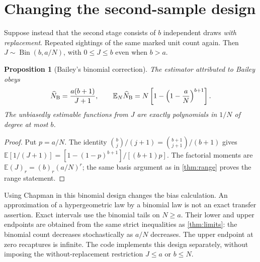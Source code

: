 \documentclass[11pt]{article}
\newtheorem{proposition}[theorem]{Proposition}
\theoremstyle{remark}\newtheorem{remark}[theorem]{Remark}
\newcommand{\E}{\mathbb E}\newcommand{\PP}{\mathbb P}
\newcommand{\fall}[2]{(#1)_{#2}}\newcommand{\rise}[2]{(#1)^{\overline{#2}}}
\begin{document}
\section{Changing the second-sample design}
Suppose instead that the second stage consists of $b$ independent draws
\emph{with replacement}. Repeated sightings of the same marked unit count
again. Then $J\sim\operatorname{Bin}(b,a/N)$, with $0\le J\le b$ even
when $b>a$.
\begin{proposition}[Bailey's binomial correction]\label{prop:bailey}
The estimator attributed to Bailey \cite{Bailey1951,Bailey1952} obeys
\[
 \widehat N_{\rm B}=\frac{a(b+1)}{J+1},\qquad
 \E_N\widehat N_{\rm B}
 =N\left[1-\left(1-\frac aN\right)^{b+1}\right].
\]
The unbiasedly estimable functions from $J$ are exactly polynomials in
$1/N$ of degree at most $b$.
\end{proposition}
\begin{proof}
Put $p=a/N$. The identity
$\binom bj/(j+1)=\binom{b+1}{j+1}/(b+1)$ gives
$\E[1/(J+1)]=[1-(1-p)^{b+1}]/[(b+1)p]$.
The factorial moments are $\E\fall{J}{r}=\fall{b}{r}(a/N)^r$;
the same basis argument as in \cref{thm:range} proves the range statement.
\end{proof}
Using Chapman in this binomial design changes the bias calculation. An
approximation of a hypergeometric law by a binomial law is not an exact
transfer assertion. Exact intervals use the binomial tails on $N\ge a$.
Their lower and upper endpoints are obtained from the same strict inequalities
as \cref{thm:limits}: the binomial count decreases stochastically as $a/N$
decreases. The upper endpoint at zero recaptures is infinite. The code
implements this design separately, without imposing the without-replacement
restriction $J\le a$ or $b\le N$.
\end{document}
